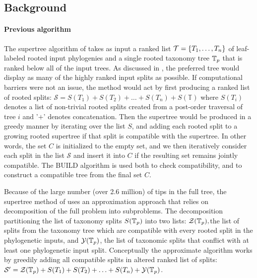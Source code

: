 \documentclass[english]{article}
\begin{document}
\subsection{Background}

\paragraph{Previous algorithm}

The supertree algorithm of \citet{redelings2017supertree} takes as
input a ranked list $\mathcal{T}=\left\{ T_{1},\ldots,T_{n}\right\} $
of leaf-labeled rooted input phylogenies and a single rooted taxonomy
tree $\mbox{\ensuremath{\mathbb{T}}}_{p}$ that is ranked below all of the input trees. As
discussed in \citet{redelings2017supertree}, the preferred tree would
display as many of the highly ranked input splits as possible. If
computational barriers were not an issue, the method would act by
first producing a ranked list of rooted splits:
$\mathcal{S}=S(T_{1})+S(T_{2})+\ldots+S(T_{n})+S(\mathbb{T})$ where
$S(T_{i})$ denotes a list of non-trivial rooted splits created from a
post-order traversal of tree $i$ and '$+$' denotes concatenation. Then
the supertree would be produced in a greedy manner by iterating over
the list $S$, and adding each rooted split to a growing rooted
supertree if that split is compatible with the supertree. In other
words, the set $C$ is initialized to the empty set, and we then
iteratively consider each split in the list $\mathcal{S}$ and insert
it into $C$ if the resulting set remains jointly compatible. The BUILD
algorithm\citep{AhoSSU1981} is used both to check compatibility, and
to construct a compatible tree from the final set $C$.

Because of the large number (over 2.6 million) of tips in the full
tree, the supertree method of \citet{redelings2017supertree} uses an
approximation approach that relies on decomposition of the full
problem into subproblems. The decomposition partitioning the list of
taxonomy splits $S(\mbox{\ensuremath{\mathbb{T}}}_{p})$ into two lists:
$\mathcal{Z}(\mbox{\ensuremath{\mathbb{T}}}_{p}),$the list of splits from the taxonomy tree
which are compatible with every rooted split in the phylogenetic
inputs, and $\mathcal{Y}(\mbox{\ensuremath{\mathbb{T}}}_{p})$, the list of taxonomic splits
that conflict with at least one phylogenetic input split. Conceptually
the approximate algorithm works by greedily adding all compatible
splits in altered ranked list of splits:
$\mathcal{S}^{\prime}=\mathcal{Z}(\mbox{\ensuremath{\mathbb{T}}}_{p})+S(T_{1})+S(T_{2})+\ldots+S(T_{n})+\mathcal{Y}(\mbox{\ensuremath{\mathbb{T}}}_{p})$.
\end{document}
